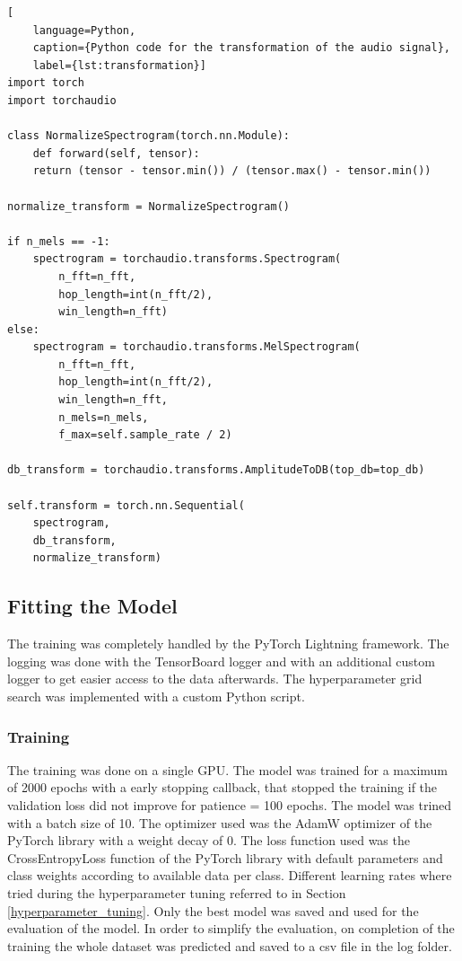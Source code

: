 \begin{lstlisting}[
    language=Python, 
    caption={Python code for the transformation of the audio signal}, 
    label={lst:transformation}]
import torch
import torchaudio

class NormalizeSpectrogram(torch.nn.Module):
    def forward(self, tensor):
    return (tensor - tensor.min()) / (tensor.max() - tensor.min())

normalize_transform = NormalizeSpectrogram()

if n_mels == -1:
    spectrogram = torchaudio.transforms.Spectrogram(
        n_fft=n_fft, 
        hop_length=int(n_fft/2), 
        win_length=n_fft)
else:
    spectrogram = torchaudio.transforms.MelSpectrogram(
        n_fft=n_fft,
        hop_length=int(n_fft/2),
        win_length=n_fft,
        n_mels=n_mels,
        f_max=self.sample_rate / 2)

db_transform = torchaudio.transforms.AmplitudeToDB(top_db=top_db)

self.transform = torch.nn.Sequential(
    spectrogram, 
    db_transform, 
    normalize_transform)
\end{lstlisting}


\subsection{Fitting the Model}%

The training was completely handled by the PyTorch Lightning framework. The logging was done
with the TensorBoard logger and with an additional custom logger to get easier access to the
data afterwards. The hyperparameter grid search was implemented with a custom Python script.

\subsubsection{Training}%

The training was done on a single GPU. The model was trained for a maximum of 2000 epochs
with a early stopping callback, that stopped the training if the validation loss did not improve
for patience = 100 epochs. The model was trined with a batch size of 10. The optimizer used was the AdamW
optimizer of the PyTorch library with a weight decay of 0. The loss function used was the
CrossEntropyLoss function of the PyTorch library with default parameters and class weights
according to available data per class. Different learning rates where tried during the hyperparameter
tuning referred to in Section \ref{hyperparameter_tuning}. Only the best model was saved and used for
the evaluation of the model. In order to simplify the evaluation, on completion of the training
the whole dataset was predicted and saved to a csv file in the log folder.

